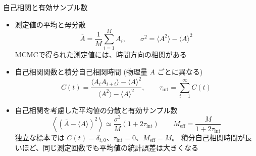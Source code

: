 
\begin{frame}[t,fragile]{自己相関と有効サンプル数}
  \begin{itemize}
    \item 測定値の平均と母分散
    \[
    \overline A=\frac{1}{M}\sum_{i=1}^{M}A_i,
    \qquad
    \sigma^2=\langle A^2\rangle-\langle A\rangle^2
    \]
    MCMCで得られた測定値には、時間方向の相関がある
  \item 自己相関関数と積分自己相関時間 (物理量 \(A\) ごとに異なる)
    \[
    C(t)=
    \frac{\langle A_iA_{i+t}\rangle-\langle A\rangle^2}
         {\langle A^2\rangle-\langle A\rangle^2},
    \qquad
    \tau_{\mathrm{int}}=\sum_{t=1}^{\infty}C(t)
    \]
  \item 自己相関を考慮した平均値の分散と有効サンプル数
    \[
    \left\langle(\overline A-\langle A\rangle)^2\right\rangle
    \simeq
    \frac{\sigma^2}{M}\left(1+2\tau_{\mathrm{int}}\right)
    \qquad M_{\mathrm{eff}}=\frac{M}{1+2\tau_{\mathrm{int}}}
    \]
    独立な標本では \(C(t)=\delta_{t,0}\)、\(\tau_{\mathrm{int}}=0\)、\(M_{\mathrm{eff}}=M\)。
    積分自己相関時間が長いほど、同じ測定回数でも平均値の統計誤差は大きくなる
  \end{itemize}
\end{frame}
